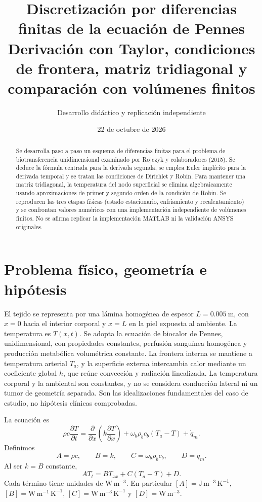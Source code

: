 \documentclass[11pt,a4paper]{article}
\title{\vspace{-1cm}\textbf{Discretización por diferencias finitas de la ecuación de Pennes}\\[6pt]
\large Derivación con Taylor, condiciones de frontera, matriz tridiagonal y comparación con volúmenes finitos}
\author{Desarrollo didáctico y replicación independiente}
\date{22 de octubre de 2026}
\begin{document}
\maketitle
\begin{abstract}
Se desarrolla paso a paso un esquema de diferencias finitas para el problema de biotransferencia unidimensional examinado por Rojczyk y colaboradores (2015). Se deduce la fórmula centrada para la derivada segunda, se emplea Euler implícito para la derivada temporal y se tratan las condiciones de Dirichlet y Robin. Para mantener una matriz tridiagonal, la temperatura del nodo superficial se elimina algebraicamente usando aproximaciones de primer y segundo orden de la condición de Robin. Se reproducen las tres etapas físicas (estado estacionario, enfriamiento y recalentamiento) y se confrontan valores numéricos con una implementación independiente de volúmenes finitos. No se afirma replicar la implementación MATLAB ni la validación ANSYS originales.
\end{abstract}

\section{Problema físico, geometría e hipótesis}
El tejido se representa por una lámina homogénea de espesor $L=\SI{0.005}{\meter}$, con $x=0$ hacia el interior corporal y $x=L$ en la piel expuesta al ambiente. La temperatura es $T(x,t)$. Se adopta la ecuación de biocalor de Pennes, unidimensional, con propiedades constantes, perfusión sanguínea homogénea y producción metabólica volumétrica constante. La frontera interna se mantiene a temperatura arterial $T_a$, y la superficie externa intercambia calor mediante un coeficiente global $h$, que reúne convección y radiación linealizada. La temperatura corporal y la ambiental son constantes, y no se considera conducción lateral ni un tumor de geometría separada. Son las idealizaciones fundamentales del caso de estudio, no hipótesis clínicas comprobadas.

La ecuación es
\begin{equation}\label{eq:pennes}
 \rho c\frac{\partial T}{\partial t}
 =\frac{\partial}{\partial x}\left(k\frac{\partial T}{\partial x}\right)
 +\omega_b\rho_b c_b(T_a-T)+\dot q_m.
\end{equation}
Definimos
\begin{equation}\label{eq:abcd}
 A=\rho c,\qquad B=k,\qquad C=\omega_b\rho_b c_b,\qquad D=\dot q_m.
\end{equation}
Al ser $k=B$ constante,
\begin{equation}\boxed{A T_t=B T_{xx}+C(T_a-T)+D.}\label{eq:governing}\end{equation}
Cada término tiene unidades de $\mathrm{W\,m^{-3}}$. En particular $[A]=\mathrm{J\,m^{-3}\,K^{-1}}$, $[B]=\mathrm{W\,m^{-1}\,K^{-1}}$, $[C]=\mathrm{W\,m^{-3}\,K^{-1}}$ y $[D]=\mathrm{W\,m^{-3}}$.
\end{document}
